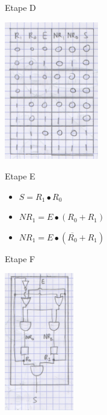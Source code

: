 Etape D
\begin{center}
  \includegraphics[height=6cm]{cours1/pics/equationtable.png}
\end{center}

Etape E
\begin{itemize}
  \item \(S=R_1 \bullet R_0\)
  \item \(NR_1 = E \bullet {(R_0 + R_1)}\)
  \item \(NR_1 = E \bullet {(\overline{R_0} + R_1)}\)
\end{itemize}

Etape F
\begin{center}
  \includegraphics[height=6cm]{cours1/pics/circuit.png}
\end{center}
